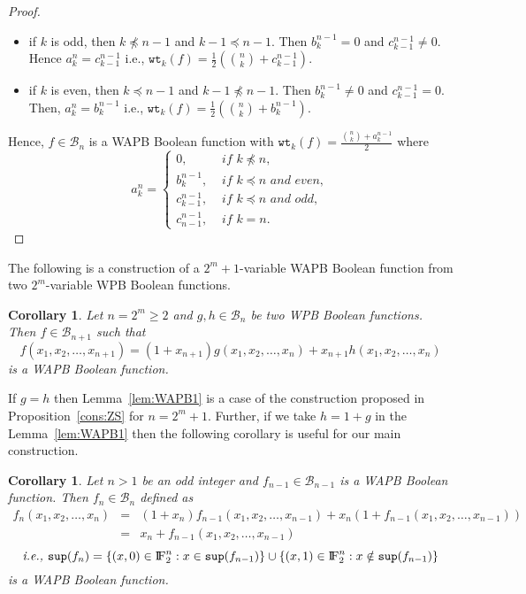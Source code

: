 \documentclass{article}[12pt]
\newtheorem{corollary}[theorem]{Corollary}
\newcommand{\FF}{{\rm I\!F}}
\newcommand{\CB}{\mathcal{B}}
\newcommand{\wt}{\mathtt{wt}}
\newcommand{\spt}{\mathtt{sup}}
\begin{document}
\begin{proof}
\begin{itemize}
    \begin{itemize}
    \item if $k$ is odd, then $k \npreceq n-1$ and $k-1 \preceq n-1$. Then $b_k^{n-1}=0$ and $c_{k-1}^{n-1} \neq 0$. Hence $a_k^n= c_{k-1}^{n-1}$ i.e., $\wt_k(f)= \frac{1}{2}\left({n \choose k} + c_{k-1}^{n-1}\right)$.
     \item if $k$ is even, then $k \preceq n-1$ and $k-1 \npreceq n-1$. Then $b_k^{n-1} \neq 0$ and $c_{k-1}^{n-1} = 0$. Then, $a_k^{n}= b_k^{n-1}$ i.e., $\wt_k(f) = \frac{1}{2} \left({n \choose k} + b_k^{n-1}\right)$. 
    \end{itemize}	
\end{itemize}
Hence, $f \in \CB_n$ is a WAPB Boolean function with $\displaystyle{\wt_k(f)= \frac{{n \choose k} + a_k^{n-1}}{2}}$ where
$$a_k^n =
\begin{cases}
		0 ,   & \textit{ if }  k \npreceq n, \\
		b_k^{n-1},	& \textit{ if }  k \preceq n \textit{ and even}, \\
		c_{k-1}^{n-1},	& \textit{ if }  k \preceq n \textit{ and odd}, \\
		c_{n-1}^{n-1}, & \textit{ if }  k = n.
\end{cases}$$
\end{proof}
The following is a construction of a $2^m+1$-variable WAPB Boolean function from two $2^m$-variable WPB Boolean functions.  
\begin{corollary}\label{cor:WAPB1}
Let $n = 2^m \geq 2$ and $g, h \in \CB_n$ be two WPB Boolean functions. Then $f \in \CB_{n+1}$ such that $$f(x_1, x_2, \ldots, x_{n+1}) = (1+x_{n+1}) g(x_1, x_2, \ldots, x_n) +  x_{n+1} h(x_1, x_2,  \ldots, x_n)$$
is a WAPB Boolean function.
\end{corollary}
If $g = h$ then Lemma~\ref{lem:WAPB1} is a case of the construction proposed in Proposition~\ref{cons:ZS} for $n = 2^m+1$. Further, if we take $h = 1+g$ in the Lemma~\ref{lem:WAPB1} then the following corollary is useful for our main construction.
\begin{corollary}\label{cor:WAPB_odd}
Let $n > 1$ be an odd integer and $f_{n-1} \in \CB_{n-1}$ is a WAPB Boolean function.
Then $f_n \in \CB_n$ defined as
\begin{eqnarray*}
f_n(x_1,x_2, \ldots, x_n) & = & (1+x_n) f_{n-1}(x_1, x_2, \ldots, x_{n-1}) +  x_n (1 + f_{n-1}(x_1, x_2,  \ldots, x_{n-1})) \\
 & = & x_n + f_{n-1}(x_1, x_2, \ldots, x_{n-1})\end{eqnarray*}
$$\textit{i.e., } \spt(f_n) = \{(x,0) \in \FF_2^n : x \in \spt(f_{n-1})\} \cup
	\{(x,1) \in \FF_2^n : x \notin \spt(f_{n-1})\}$$
 is a WAPB Boolean function.
\end{corollary}
\end{document}
